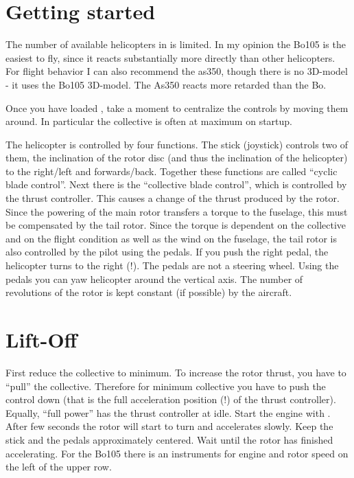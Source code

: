 \section{Getting started}

The number of available helicopters in \FlightGear is limited. In my opinion 
the Bo105 is the easiest to fly, since it reacts substantially more directly 
than other helicopters. For flight behavior I can also recommend the as350, 
though there is no 3D-model - it uses the Bo105 3D-model. The As350 reacts 
more retarded than the Bo. 

Once you have loaded \FlightGear, take a moment to centralize the controls by 
moving them around. In particular the collective is often at maximum on startup. 


The helicopter is controlled by four functions. The stick (joystick) controls 
two of them, the inclination of the rotor disc (and thus the inclination of 
the helicopter) to the right/left and forwards/back. Together these functions 
are called ``cyclic blade control''. Next there is the ``collective blade 
control'', which is controlled by the thrust controller. This causes a change 
of the thrust produced by the rotor. Since the powering of the main rotor 
transfers a torque to the fuselage, this must be compensated by the 
tail rotor. Since the torque is dependent on the collective and on the flight 
condition as well as the wind on the fuselage, the tail rotor is also 
controlled by the pilot using the pedals. If you push the right pedal, 
the helicopter turns to the right (!). The pedals are not a steering wheel. 
Using the pedals you can yaw helicopter around the vertical axis. The 
number of revolutions of the rotor is kept constant (if possible) by the 
aircraft. 


\section{Lift-Off}

First reduce the collective to minimum. To increase the rotor thrust, you have 
to ``pull'' the collective. Therefore for minimum collective you have to push 
the control down (that is the full acceleration position (!) of the thrust 
controller). Equally, ``full power'' has the thrust controller at idle. 
Start the engine with \key{\}}. After few seconds the rotor will start to 
turn and accelerates slowly. Keep the stick and the pedals approximately 
centered. Wait until the rotor has finished accelerating. For the Bo105 there 
is an instruments for engine and rotor speed on the left of the upper row. 

